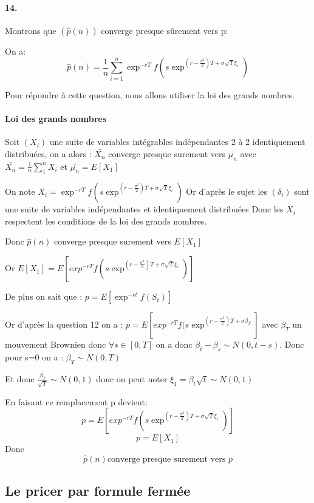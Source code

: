 \documentclass[10pt]{article}
\begin{document}
  \paragraph{14.} Montrons que $ (\hat{p}(n)) $ converge presque sûrement vers p:
  
  On a: $$\hat{p}(n) = \frac{1}{n} \sum_{i=1}^n \exp^{-rT}f(s\exp^{(r-\frac{\sigma^2}{2})T + \sigma \sqrt{T}\xi_i})$$
  
  Pour répondre à cette question, nous allons utiliser la loi des grands nombres.
  
  \paragraph{Loi des grands nombres} Soit $(X_i)$ une suite de variables intégrables indépendantes 2 à 2 identiquement distribuées, on a alors :
  $ \bar{X_n}$ converge presque surement vers $ \bar{\mu_n} $ avec $ \bar{X_n} = \frac{1}{n} \sum_1^n X_i $ et $ \bar{\mu_n} = E[X_1] $
  
  On note $X_i = \exp^{-rT}f(s\exp^{(r-\frac{\sigma^2}{2})T + \sigma \sqrt{T}\xi_i})$
  Or d'après le sujet les $(\delta_i)$ sont une suite de variables indépendantes et identiquement distribuées
  Donc les $X_i$ respectent les conditions de la loi des grands nombres.
  
  Donc $\hat{p}(n)$ converge presque surement vers $E[X_1]$
  
  Or $E[X_1] = E[exp^{-rT}f(s\exp^{(r-\frac{\sigma^2}{2})T + \sigma \sqrt{T}\xi_i})]$
  
  De plus on sait que : $p = E[\exp^{-rt}f(S_t)]$
  
  Or d'après la question 12 on a :
  $ p = E[exp^{-rT}f(s\exp^{(r-\frac{\sigma^2}{2})T + \sigma \beta_T}] $
  avec $\beta_T$ un mouvement Brownien donc $ \forall s \in [0,T] $ on a donc $\beta_t - \beta_s \sim N(0,t-s) $. Donc pour s=0 on a : $ \beta_T \sim N(0,T) $
  
  Et donc $ \frac{\beta_T}{\sqrt{T}} \sim N(0,1) $ donc on peut noter $ \xi_1 = \beta_t \sqrt{t} \sim N(0,1) $
  
  En faisant ce remplacement p devient:
  $$p = E[exp^{-rT}f(s\exp^{(r-\frac{\sigma^2}{2})T + \sigma \sqrt{T}\xi_i})]$$
  $$p=E[X_1]$$
  Donc $$\boxed {\hat{p}(n) \text{converge presque surement vers } p}$$
  
  \newpage
  \subsection{Le pricer par formule fermée}
\end{document}
